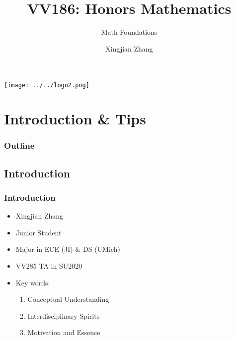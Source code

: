 \documentclass[10pt, t]{beamer}
\title{VV186: Honors Mathematics}
\subtitle{\large Math Foundations}
\institute[UM-SJTU JI]{Univerity of Michigan-Shanghai Jiao Tong University Joint Institute}
\author{Xingjian Zhang}
\begin{document}
\begin{frame}
    \titlepage
    \begin{center}
        \texttt{[image: ../../logo2.png]}
    \end{center}
\end{frame}

\section{Introduction \& Tips}
\begin{frame}
    \frametitle{Outline}
    \begin{spacing}{1}
        \tableofcontents
    \end{spacing}
\end{frame}

\subsection{Introduction}
\begin{frame}
    \frametitle{Introduction}
    \begin{itemize}
        \item Xingjian Zhang
        \item Junior Student
        \item Major in ECE (JI) \& DS (UMich)
        \item VV285 TA in SU2020
        \item Key words:
              \begin{enumerate}
                  \item Conceptual Understanding
                  \item Interdisciplinary Spirits
                  \item Motivation and Essence
              \end{enumerate}
    \end{itemize}
\end{frame}
\end{document}
